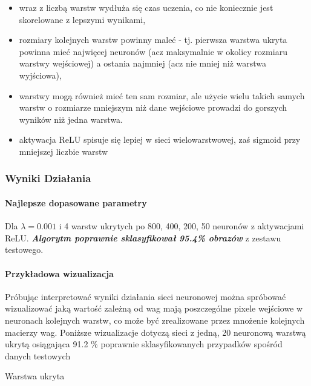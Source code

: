 \documentclass[11pt]{article}
\providecommand{\tightlist}{%
      \setlength{\itemsep}{0pt}\setlength{\parskip}{0pt}}
\begin{document}
\begin{itemize}
\tightlist
\item
  wraz z liczbą warstw wydłuża się czas uczenia, co nie koniecznie jest
  skorelowane z lepszymi wynikami,
\item
  rozmiary kolejnych warstw powinny maleć - tj. pierwsza warstwa ukryta
  powinna mieć najwięcej neuronów (acz maksymalnie w okolicy rozmiaru
  warstwy wejściowej) a ostania najmniej (acz nie mniej niż warstwa
  wyjściowa),
\item
  warstwy mogą również mieć ten sam rozmiar, ale użycie wielu takich
  samych warstw o rozmiarze mniejszym niż dane wejściowe prowadzi do
  gorszych wyników niż jedna warstwa.
\item
  aktywacja ReLU spisuje się lepiej w sieci wielowarstwowej, zaś sigmoid
  przy mniejszej liczbie warstw
\end{itemize}
\clearpage
\hypertarget{wyniki-dziaux142ania}{%
\subsubsection{Wyniki Działania}\label{wyniki-dziaux142ania}}

\hypertarget{najlepsze-dopasowane-parametry}{%
\paragraph{Najlepsze dopasowane
parametry}\label{najlepsze-dopasowane-parametry}}

Dla \(\lambda = 0.001\) i  4 warstw ukrytych po 800, 400, 200, 50 neuronów z aktywacjami ReLU. \textbf{\emph{Algorytm poprawnie sklasyfikował 95.4\%
obrazów}} z zestawu testowego.

\hypertarget{przykux142adowa-wizualizacja}{%
\paragraph{Przykładowa
wizualizacja}\label{przykux142adowa-wizualizacja}}

Próbując interpretować wyniki działania sieci neuronowej można spróbować
wizualizować jaką wartość zależną od wag mają poszczególne pixele
wejściowe w neuronach kolejnych warstw, co może być zrealizowane przez
mnożenie kolejnych macierzy wag. Poniższe wizualizacje dotyczą sieci z
jedną, 20 neuronową warstwą ukrytą osiągająca 91.2 \% poprawnie
sklasyfikowanych przypadków spośród danych testowych

Warstwa ukryta

\\
\end{document}
